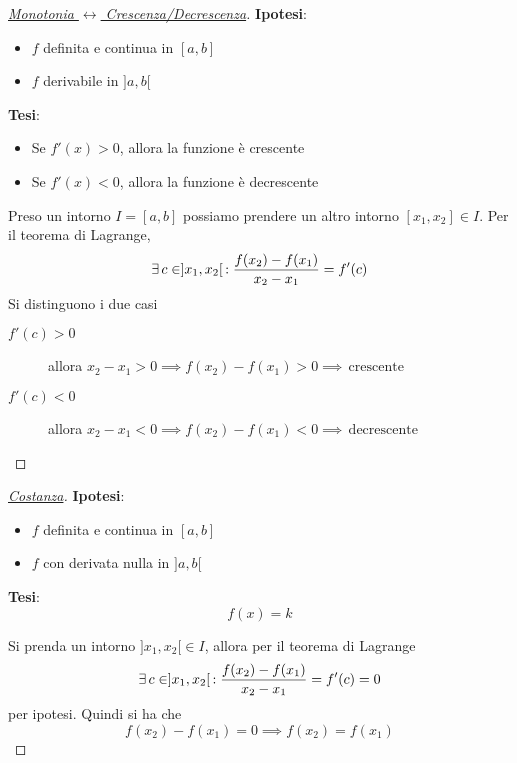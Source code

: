 \begin{proof}
  [\protect\hyperlink{teor:lagrange:1}{Monotonia $\leftrightarrow$ Crescenza/Decrescenza}]
  \textbf{Ipotesi}:
  \begin{itemize}
    \item $f$ definita e continua in $[a,b]$
    \item $f$ derivabile in $]a,b[$
  \end{itemize}
  \textbf{Tesi}:
  \begin{itemize}
    \item Se $f'(x) > 0$, allora la funzione è crescente
    \item Se $f'(x) < 0$, allora la funzione è decrescente
  \end{itemize}
  \divisor

  Preso un intorno $I=[a,b]$ possiamo prendere un altro intorno $[x_1,x_2]\in I$. Per il teorema
  di Lagrange,
  \begin{equation*}
    \exists\,c\in]x_1,x_2[\,: \frac{f(x_2)-f(x_1)}{x_2-x_1}=f'(c)
  \end{equation*}
  Si distinguono i due casi
  \begin{description}
    \item[$f'(c)>0$] allora $x_2-x_1>0 \implies f(x_2)-f(x_1)>0 \implies\,\text{crescente}$ 
    \item[$f'(c)<0$] allora $x_2-x_1<0 \implies f(x_2)-f(x_1)<0\implies\,\text{decrescente}$
  \end{description}
\end{proof}

\begin{proof}
  [\protect\hyperlink{teor:lagrange:2}{Costanza}]
  \textbf{Ipotesi}: 
  \begin{itemize}
    \item $f$ definita e continua in $[a,b]$
    \item $f$ con derivata nulla in $]a,b[$
  \end{itemize}
  \textbf{Tesi}:
  \begin{equation*}
    f(x) = k
  \end{equation*}
  \divisor

  Si prenda un intorno $]x_1,x_2[\in I$, allora per il teorema di Lagrange
  \begin{equation*}
    \exists\,c\in]x_1,x_2[\,: \frac{f(x_2)-f(x_1)}{x_2-x_1}=f'(c)=0
  \end{equation*}
  per ipotesi. Quindi si ha che
  \begin{equation*}
    f(x_2) - f(x_1) = 0 \implies f(x_2) = f(x_1)
  \end{equation*}
\end{proof}

